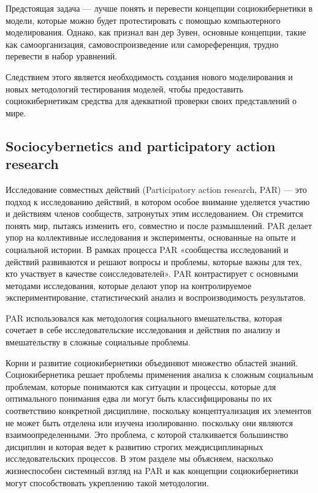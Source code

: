\documentclass[a4page]{article}
\begin{document}
Предстоящая задача — лучше понять и перевести концепции социокибернетики в модели, которые можно будет протестировать с помощью компьютерного моделирования. Однако, как признал ван дер Зувен, основные концепции, такие как самоорганизация, самовоспроизведение или самореференция, трудно перевести в набор уравнений.

Следствием этого является необходимость создания нового моделирования и новых методологий тестирования моделей, чтобы предоставить социокибернетикам средства для адекватной проверки своих представлений о мире.

\subsection{Sociocybernetics and participatory action research}
Исследование совместных действий (Participatory action research, PAR) — это подход к исследованию действий, в котором особое внимание уделяется участию и действиям членов сообществ, затронутых этим исследованием. Он стремится понять мир, пытаясь изменить его, совместно и после размышлений. PAR делает упор на коллективные исследования и эксперименты, основанные на опыте и социальной истории. В рамках процесса PAR «сообщества исследований и действий развиваются и решают вопросы и проблемы, которые важны для тех, кто участвует в качестве соисследователей». PAR контрастирует с основными методами исследования, которые делают упор на контролируемое экспериментирование, статистический анализ и воспроизводимость результатов\cite{enwiki:par}.

PAR использовался как методология социального вмешательства, которая сочетает в себе исследовательские исследования и действия по анализу и вмешательству в сложные социальные проблемы.

Корни и развитие социокибернетики объединяют множество областей знаний. Социокибернетика решает проблемы применения анализа к сложным социальным проблемам, которые понимаются как ситуации и процессы, которые для оптимального понимания едва ли могут быть классифицированы по их соответствию конкретной дисциплине, поскольку концептуализация их элементов не может быть отделена или изучена изолированно. поскольку они являются взаимоопределенными\cite{sistemas_complejos}. Это проблема, с которой сталкивается большинство дисциплин и которая ведет к развитию строгих междисциплинарных исследовательских процессов. В этом разделе мы объясняем, насколько жизнеспособен системный взгляд на PAR и как концепции социокибернетики могут способствовать укреплению такой методологии.
\end{document}

